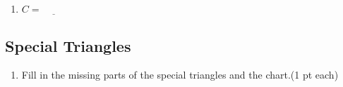 \documentclass[12pt]{article}
\begin{document}
\begin{enumerate}

	\item $C=\underline{\hspace{1cm}}$\\

\end{enumerate}

\pagebreak

\subsection*{Special Triangles}

\begin{enumerate}[resume]
	\item Fill in the missing parts of the special triangles and the chart.(1 pt each)\\
\end{enumerate}
\end{document}

